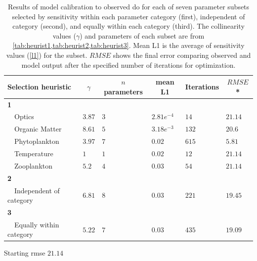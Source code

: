 \documentclass[review]{elsarticle}\usepackage[]{graphicx}\usepackage[]{color}
\begin{document}
\begin{table}[!tbp]
{\scriptsize
\caption{Results of model calibration to observed \ac{do} for each of seven parameter subsets selected by sensitivity within each parameter category (first), independent of category (second), and equally within each category (third). The collinearity values ($\gamma$) and parameters of each subset are from \cref{tab:heurist1,tab:heurist2,tab:heurist3}.  Mean L1 is the average of sensitivity values (\cref{l1}) for the subset.  $RMSE$ shows the final error comparing observed and model output after the specified number of iterations for optimization.\label{tab:calib}} 
\begin{center}
\begin{tabular}{llllll}
\hline\hline
\multicolumn{1}{l}{Selection heuristic}&\multicolumn{1}{c}{$\gamma$}&\multicolumn{1}{c}{$n$ parameters}&\multicolumn{1}{c}{mean L1}&\multicolumn{1}{c}{Iterations}&\multicolumn{1}{c}{$RMSE$*}\tabularnewline
\hline
{\bfseries 1}&&&&&\tabularnewline
~~Optics&$3.87$&$3$&$2.81e^{-4}$&$14$&$21.14$\tabularnewline
~~Organic Matter&$8.61$&$5$&$3.18e^{-3}$&$132$&$20.6$\tabularnewline
~~Phytoplankton&$3.97$&$7$&$0.02$&$615$&$5.81$\tabularnewline
~~Temperature&$1$&$1$&$0.02$&$12$&$21.14$\tabularnewline
~~Zooplankton&$5.2$&$4$&$0.03$&$54$&$21.14$\tabularnewline
\hline
{\bfseries 2}&&&&&\tabularnewline
~~Independent of category&$6.81$&$8$&$0.03$&$221$&$19.45$\tabularnewline
\hline
{\bfseries 3}&&&&&\tabularnewline
~~Equally within category&$5.22$&$7$&$0.03$&$435$&$19.09$\tabularnewline
\hline
\end{tabular}\end{center}}
\footnotesize *Starting \ac{rmse} $21.14$\end{table}
\end{document}
